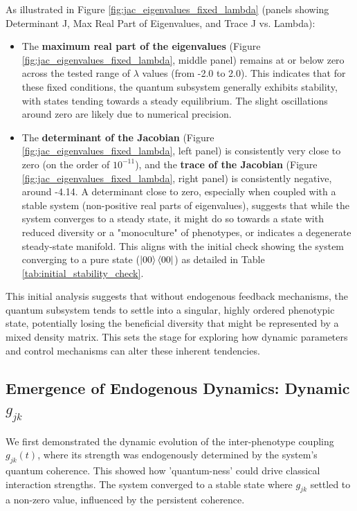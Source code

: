 \documentclass[9pt]{article}
\begin{document}
As illustrated in Figure \ref{fig:jac_eigenvalues_fixed_lambda} (panels showing Determinant J, Max Real Part of Eigenvalues, and Trace J vs. Lambda):
\begin{itemize}
    \item The \textbf{maximum real part of the eigenvalues} (Figure \ref{fig:jac_eigenvalues_fixed_lambda}, middle panel) remains at or below zero across the tested range of $\lambda$ values (from -2.0 to 2.0). This indicates that for these fixed conditions, the quantum subsystem generally exhibits stability, with states tending towards a steady equilibrium. The slight oscillations around zero are likely due to numerical precision.
    \item The \textbf{determinant of the Jacobian} (Figure \ref{fig:jac_eigenvalues_fixed_lambda}, left panel) is consistently very close to zero (on the order of $10^{-11}$), and the \textbf{trace of the Jacobian} (Figure \ref{fig:jac_eigenvalues_fixed_lambda}, right panel) is consistently negative, around -4.14. A determinant close to zero, especially when coupled with a stable system (non-positive real parts of eigenvalues), suggests that while the system converges to a steady state, it might do so towards a state with reduced diversity or a "monoculture" of phenotypes, or indicates a degenerate steady-state manifold. This aligns with the initial check showing the system converging to a pure state ($\ket{00}\bra{00}$) as detailed in Table \ref{tab:initial_stability_check}.
\end{itemize}

This initial analysis suggests that without endogenous feedback mechanisms, the quantum subsystem tends to settle into a singular, highly ordered phenotypic state, potentially losing the beneficial diversity that might be represented by a mixed density matrix. This sets the stage for exploring how dynamic parameters and control mechanisms can alter these inherent tendencies.

\subsection{Emergence of Endogenous Dynamics: Dynamic \texorpdfstring{$g_{jk}$}{gjk}} \label{sec:dynamic_gjk_section}
We first demonstrated the dynamic evolution of the inter-phenotype coupling $g_{jk}(t)$, where its strength was endogenously determined by the system's quantum coherence. This showed how 'quantum-ness' could drive classical interaction strengths. The system converged to a stable state where $g_{jk}$ settled to a non-zero value, influenced by the persistent coherence.
\end{document}
